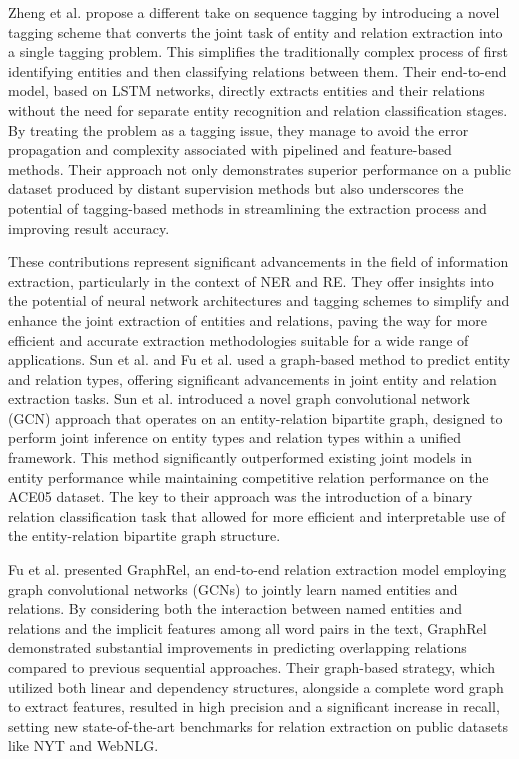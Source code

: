Zheng et al. propose a different take on sequence tagging by introducing a novel tagging scheme that converts the joint task of entity and relation extraction into a single tagging problem. This simplifies the traditionally complex process of first identifying entities and then classifying relations between them. Their end-to-end model, based on LSTM networks, directly extracts entities and their relations without the need for separate entity recognition and relation classification stages. By treating the problem as a tagging issue, they manage to avoid the error propagation and complexity associated with pipelined and feature-based methods. Their approach not only demonstrates superior performance on a public dataset produced by distant supervision methods but also underscores the potential of tagging-based methods in streamlining the extraction process and improving result accuracy.

These contributions represent significant advancements in the field of information extraction, particularly in the context of NER and RE. They offer insights into the potential of neural network architectures and tagging schemes to simplify and enhance the joint extraction of entities and relations, paving the way for more efficient and accurate extraction methodologies suitable for a wide range of applications.
Sun et al.\cite{sun-etal-2019-joint} and Fu et al.\cite{fu-etal-2019-graphrel} used a graph-based method to predict entity and relation types, offering significant advancements in joint entity and relation extraction tasks. Sun et al. introduced a novel graph convolutional network (GCN) approach that operates on an entity-relation bipartite graph, designed to perform joint inference on entity types and relation types within a unified framework. This method significantly outperformed existing joint models in entity performance while maintaining competitive relation performance on the ACE05 dataset. The key to their approach was the introduction of a binary relation classification task that allowed for more efficient and interpretable use of the entity-relation bipartite graph structure.

Fu et al. presented GraphRel, an end-to-end relation extraction model employing graph convolutional networks (GCNs) to jointly learn named entities and relations. By considering both the interaction between named entities and relations and the implicit features among all word pairs in the text, GraphRel demonstrated substantial improvements in predicting overlapping relations compared to previous sequential approaches. Their graph-based strategy, which utilized both linear and dependency structures, alongside a complete word graph to extract features, resulted in high precision and a significant increase in recall, setting new state-of-the-art benchmarks for relation extraction on public datasets like NYT and WebNLG.

